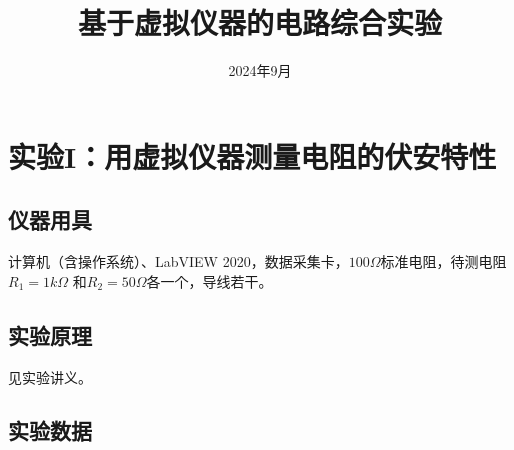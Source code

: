 \documentclass[12pt, a4paper]{ctexart}
\begin{document}
\title{基于虚拟仪器的电路综合实验}
\date{2024年9月}

\maketitle
\tableofcontents
\clearpage

\section{实验I：用虚拟仪器测量电阻的伏安特性}

\subsection*{仪器用具}
计算机（含操作系统）、LabVIEW 2020，数据采集卡，$100\Omega$标准电阻，待测电阻$R_1 = 1k\Omega$
和$R_2 = 50\Omega$各一个，导线若干。

\subsection{实验原理}
见实验讲义。

\subsection{实验数据}
\end{document}
